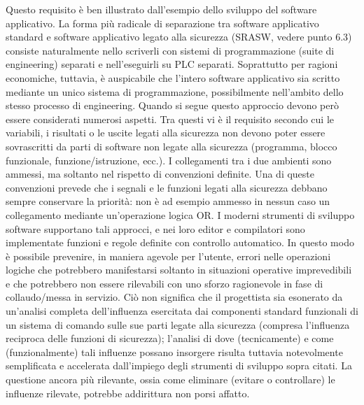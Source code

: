 Questo requisito è ben illustrato dall'esempio dello sviluppo del software applicativo. La forma più radicale di separazione tra software applicativo standard e software applicativo legato alla sicurezza (SRASW, vedere punto 6.3) consiste naturalmente nello scriverli con sistemi di programmazione (suite di engineering) separati e nell'eseguirli su PLC separati. Soprattutto per ragioni economiche, tuttavia, è auspicabile che l'intero software applicativo sia scritto mediante un unico sistema di programmazione, possibilmente nell'ambito dello stesso processo di engineering. Quando si segue questo approccio devono però essere considerati numerosi aspetti. Tra questi vi è il requisito secondo cui le variabili, i risultati o le uscite legati alla sicurezza non devono poter essere sovrascritti da parti di software non legate alla sicurezza (programma, blocco funzionale, funzione/istruzione, ecc.). I collegamenti tra i due ambienti sono ammessi, ma soltanto nel rispetto di convenzioni definite. Una di queste convenzioni prevede che i segnali e le funzioni legati alla sicurezza debbano sempre conservare la priorità: non è ad esempio ammesso in nessun caso un collegamento mediante un'operazione logica OR. I moderni strumenti di sviluppo software supportano tali approcci, e nei loro editor e compilatori sono implementate funzioni e regole definite con controllo automatico. In questo modo è possibile prevenire, in maniera agevole per l'utente, errori nelle operazioni logiche che potrebbero manifestarsi soltanto in situazioni operative imprevedibili e che potrebbero non essere rilevabili con uno sforzo ragionevole in fase di collaudo/messa in servizio.
Ciò non significa che il progettista sia esonerato da un'analisi completa dell'influenza esercitata dai componenti standard funzionali di un sistema di comando sulle sue parti legate alla sicurezza (compresa l'influenza reciproca delle funzioni di sicurezza); l'analisi di dove (tecnicamente) e come (funzionalmente) tali influenze possano insorgere risulta tuttavia notevolmente semplificata e accelerata dall'impiego degli strumenti di sviluppo sopra citati. La questione ancora più rilevante, ossia come eliminare (evitare o controllare) le influenze rilevate, potrebbe addirittura non porsi affatto.

